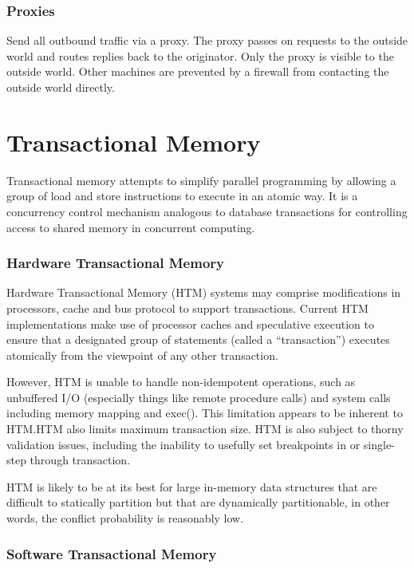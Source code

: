 \documentclass[a4paper,oneside]{report}
\begin{document}
		\subsection{Proxies}
		Send all outbound traffic via a proxy. The proxy passes on requests to the outside world and routes replies back to the originator.
		Only the proxy is visible to the outside world.
		Other machines are prevented by a firewall from contacting the outside world directly.

  		\chapter{Transactional Memory}
  	
  	Transactional memory attempts to simplify parallel programming by allowing a group of load and store instructions to execute in an atomic way. It is a concurrency control mechanism analogous to database transactions for controlling access to shared memory in concurrent computing.
  	
  	\subsection{Hardware Transactional Memory}
  	Hardware Transactional Memory (HTM) systems may comprise modifications in processors, cache and bus protocol to support transactions. Current HTM implementations make use of processor caches and speculative execution to ensure that a designated group of statements (called a “transaction”) executes atomically from the viewpoint of any other transaction. 

However, HTM is unable to handle non-idempotent operations, such as unbuffered I/O (especially things like remote procedure calls) and system calls including memory mapping and exec(). This limitation appears to be inherent to HTM.HTM also limits maximum transaction size. HTM is also subject to thorny validation issues, including the inability to usefully set breakpoints in or single-step through transaction. 

HTM is likely to be at its best for large in-memory data structures that are difficult to statically partition but that are dynamically partitionable, in other words, the conflict probability is reasonably low. 
  	
  	\subsection{Software Transactional Memory}
  	
\end{document}
